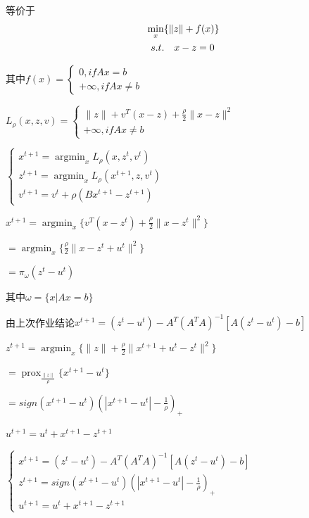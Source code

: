 \documentclass{xjtureport}
\begin{document}
等价于
\begin{equation}
    \begin{aligned} \label{P}
        & \mathop{\min}_{x}\{ \|z\| + f(x)\}\\
        &\begin{array}[]{r@{\quad}r@{}l@{\quad}l}
        s.t.& x - z = 0\\
        \end{array}
    \end{aligned}
\end{equation}

其中$f(x)=\left\{\begin{matrix}
    0,if Ax = b\\ 
    +\infty,if Ax \neq b  
   \end{matrix}\right.$

$L_\rho (x,z,v) = \left\{\begin{matrix}
    \|z\| + v^T(x-z) + \frac{\rho}{2} \|x-z \|^2\\ 
    +\infty,if Ax \neq b
   \end{matrix}\right.$

$ \left\{\begin{matrix}
x^{t+1} =\mathop{argmin}_{x}L_\rho (x,z^t,v^t)\\ 
z^{t+1} =\mathop{argmin}_{x}L_\rho (x^{t+1},z,v^{t})\\ 
v^{t+1} = v^t + \rho(Bx^{t+1} -z^{t+1}) 
\end{matrix}\right.$

$x^{t+1} = \mathop{argmin}_x \{v^T(x-z^t) + \frac{\rho}{2}\|x -z^t\|^2\}$

$= \mathop{argmin}_x\{ \frac{\rho}{2}\|x -z^t + u^t\|^2\}$

$ = \pi_\omega(z^t - u^t)$

其中$\omega = \{ x| Ax  = b \} $

由上次作业结论$x^{t+1} = (z^t - u^t) - A^T(A^TA)^{-1}[A(z^t-u^t)-b]$

$z^{t+1} = \mathop{argmin}_{x} \{ \|z\| + \frac{\rho}{2} \|x^{t+1} + u^t - z^t\|^2\}$

$= \mathop{prox}_{\frac{\|z\|}{\rho}}\{ x^{t+1} - u^t\}$

$= sign(x^{t+1} - u^t)(|x^{t+1} - u^t| - \frac{1}{\rho})_+$

$u^{t+1} = u^t + x^{t+1} -z^{t+1}$


$\left\{\begin{matrix}
    x^{t+1} =(z^t - u^t) - A^T(A^TA)^{-1}[A(z^t-u^t)-b]\\ 
    z^{t+1} =sign(x^{t+1} - u^t)(|x^{t+1} - u^t| - \frac{1}{\rho})_+\\ 
    u^{t+1} = u^t + x^{t+1} -z^{t+1} 
   \end{matrix}\right.$
\end{document}
